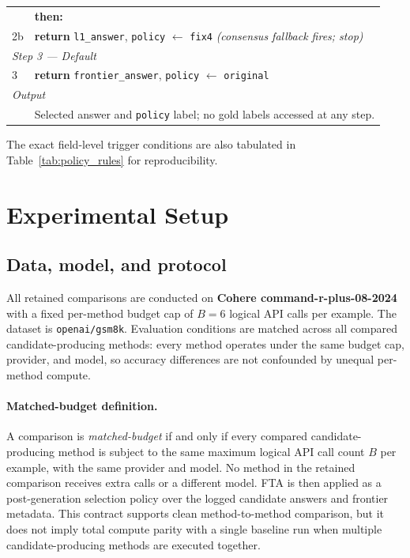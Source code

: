 \documentclass[smallcondensed]{svjour3}
\begin{document}
\begin{table}[t]
\begin{tabular}{p{} p{}}
   & \textbf{then:} \\
2b & \quad \textbf{return} \texttt{l1\_answer}, \texttt{policy} $\leftarrow$ \texttt{fix4} \quad\quad \textit{(consensus fallback fires; stop)} \\
\midrule
\multicolumn{2}{l}{\textit{Step 3 --- Default}} \\
3  & \textbf{return} \texttt{frontier\_answer}, \texttt{policy} $\leftarrow$ \texttt{original} \\
\midrule
\multicolumn{2}{l}{\textit{Output}} \\
& Selected answer and \texttt{policy} label; no gold labels accessed at any step. \\
\bottomrule
\end{tabular}
\end{table}

The exact field-level trigger conditions are also tabulated in
Table~\ref{tab:policy_rules} for reproducibility.

\section{Experimental Setup}
\label{sec:experiments}

\subsection{Data, model, and protocol}
All retained comparisons are conducted on \textbf{Cohere command-r-plus-08-2024} with a fixed per-method budget cap of $B = 6$ logical API calls per example.  The dataset is \texttt{openai/gsm8k}.  Evaluation conditions are matched across all compared candidate-producing methods: every method operates under the same budget cap, provider, and model, so accuracy differences are not confounded by unequal per-method compute.

\paragraph{Matched-budget definition.} A comparison is \emph{matched-budget} if and only if every compared candidate-producing method is subject to the same maximum logical API call count $B$ per example, with the same provider and model.  No method in the retained comparison receives extra calls or a different model.  FTA is then applied as a post-generation selection policy over the logged candidate answers and frontier metadata.
This contract supports clean method-to-method comparison, but it does not imply total compute parity with a single baseline run when multiple candidate-producing methods are executed together.
\end{document}
